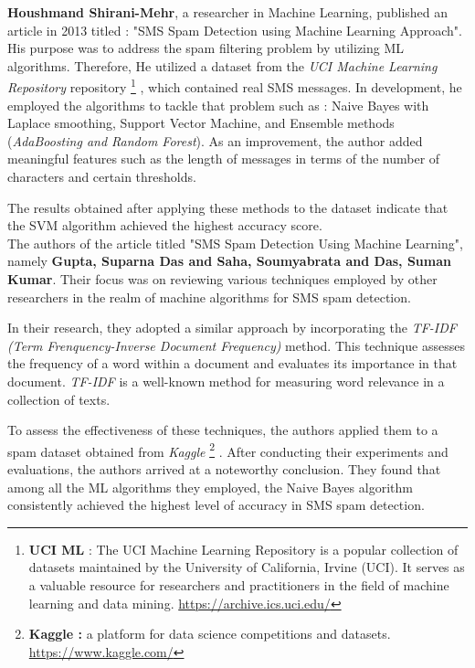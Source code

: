\documentclass[12pt,a4paper]{report}
\begin{document}
	\cite{shirani2013sms}  \textbf{Houshmand Shirani-Mehr}, a researcher in Machine Learning, published an article in 2013 titled : "SMS Spam Detection using Machine Learning Approach". His purpose was to address the spam filtering problem by utilizing ML algorithms. Therefore, He utilized a dataset from the  \textit{UCI Machine Learning Repository} repository \footnote{\textbf{UCI ML} : The UCI Machine Learning Repository is a popular collection of datasets maintained by the University of California, Irvine (UCI). It serves as a valuable resource for researchers and practitioners in the field of machine learning and data mining. \url{https://archive.ics.uci.edu/}} , which contained real SMS messages. In development, he employed the algorithms to tackle that problem such as :  Naive Bayes with Laplace smoothing, Support Vector Machine, and Ensemble methods (\textit{AdaBoosting and Random Forest}). As an improvement, the author added meaningful features such as the length of messages in terms of the number of characters and certain thresholds.
	
	The results obtained after applying these methods to the dataset indicate that the SVM algorithm achieved the highest accuracy score.
	\\
	
	\cite{gupta2021sms} The authors of the article titled "SMS Spam Detection Using Machine Learning", namely
	\textbf{Gupta, Suparna Das and Saha, Soumyabrata and Das, Suman Kumar}. Their focus was on reviewing various techniques employed by other researchers in the realm of machine algorithms for SMS spam detection. 
	
	In their research, they adopted a similar approach by incorporating the \textit{TF-IDF (Term Frenquency-Inverse Document Frequency)} method. This technique assesses the frequency of a word within a document and evaluates its importance in that document. \textit{TF-IDF} is a well-known method for measuring word relevance in a collection of texts.
	
	To assess the effectiveness of these techniques, the authors applied them to a spam dataset obtained from \textit{Kaggle} 
	\footnote{ \textbf{Kaggle :} a platform for data science competitions and datasets. \url{https://www.kaggle.com/}}
	. After conducting their experiments and evaluations, the authors arrived at a noteworthy conclusion. They found that among all the ML algorithms they employed, the Naive Bayes algorithm consistently achieved the highest level of accuracy in SMS spam detection.\\
	
\end{document}
